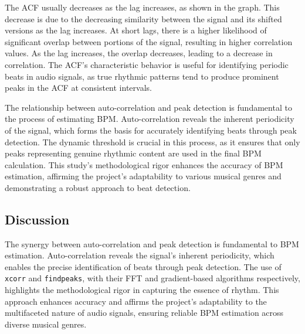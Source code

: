 The ACF usually decreases as the lag increases, as shown in the graph. This decrease is due to the decreasing similarity between the signal and its shifted versions as the lag increases. At short lags, there is a higher likelihood of significant overlap between portions of the signal, resulting in higher correlation values. As the lag increases, the overlap decreases, leading to a decrease in correlation. The ACF's characteristic behavior is useful for identifying periodic beats in audio signals, as true rhythmic patterns tend to produce prominent peaks in the ACF at consistent intervals.

The relationship between auto-correlation and peak detection is fundamental to the process of estimating BPM. Auto-correlation reveals the inherent periodicity of the signal, which forms the basis for accurately identifying beats through peak detection. The dynamic threshold is crucial in this process, as it ensures that only peaks representing genuine rhythmic content are used in the final BPM calculation. This study's methodological rigor enhances the accuracy of BPM estimation, affirming the project's adaptability to various musical genres and demonstrating a robust approach to beat detection.

\subsection{Discussion}

The synergy between auto-correlation and peak detection is fundamental to BPM estimation. Auto-correlation reveals the signal's inherent periodicity, which enables the precise identification of beats through peak detection. The use of \texttt{xcorr} and \texttt{findpeaks}, with their FFT and gradient-based algorithms respectively, highlights the methodological rigor in capturing the essence of rhythm. This approach enhances accuracy and affirms the project's adaptability to the multifaceted nature of audio signals, ensuring reliable BPM estimation across diverse musical genres.
